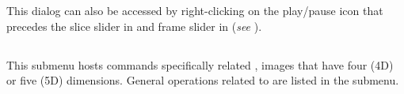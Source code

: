 This dialog can also be accessed by right-clicking on the play/pause
icon that precedes the slice slider in 
and frame slider in  (\emph{see} ).




\subsection{\protect{}\label{sub:Hyperstacks}}

This submenu hosts commands specifically related ,
images that have four (4D) or five (5D) dimensions. General operations
related to  are listed in the 
submenu.


\subsubsection{\protect{}\label{sub:New-Hyperstack...}}

